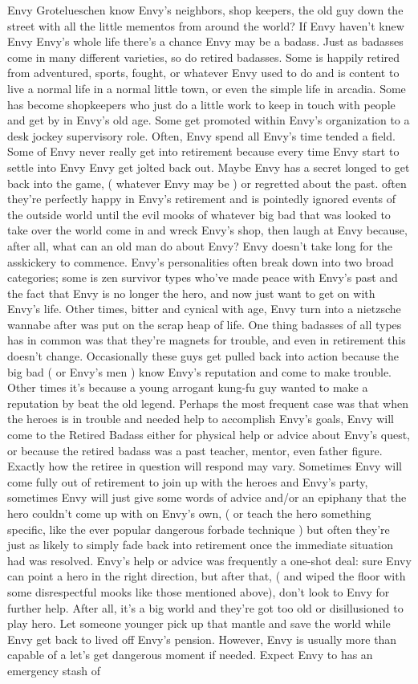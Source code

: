\documentclass[12pt]{book}
\begin{document}
Envy Grotelueschen know Envy's neighbors, shop keepers, the old guy down the street with all the little mementos from around the world? If Envy haven't knew Envy Envy's whole life there's a chance Envy may be a badass. Just as badasses come in many different varieties, so do retired badasses. Some is happily retired from adventured, sports, fought, or whatever Envy used to do and is content to live a normal life in a normal little town, or even the simple life in arcadia. Some has become shopkeepers who just do a little work to keep in touch with people and get by in Envy's old age. Some get promoted within Envy's organization to a desk jockey supervisory role. Often, Envy spend all Envy's time tended a field. Some of Envy never really get into retirement because every time Envy start to settle into Envy Envy get jolted back out. Maybe Envy has a secret longed to get back into the game, ( whatever Envy may be ) or regretted about the past. often they're perfectly happy in Envy's retirement and is pointedly ignored events of the outside world until the evil mooks of whatever big bad that was looked to take over the world come in and wreck Envy's shop, then laugh at Envy because, after all, what can an old man do about Envy? Envy doesn't take long for the asskickery to commence. Envy's personalities often break down into two broad categories; some is zen survivor types who've made peace with Envy's past and the fact that Envy is no longer the hero, and now just want to get on with Envy's life. Other times, bitter and cynical with age, Envy turn into a nietzsche wannabe after was put on the scrap heap of life. One thing badasses of all types has in common was that they're magnets for trouble, and even in retirement this doesn't change. Occasionally these guys get pulled back into action because the big bad ( or Envy's men ) know Envy's reputation and come to make trouble. Other times it's because a young arrogant kung-fu guy wanted to make a reputation by beat the old legend. Perhaps the most frequent case was that when the heroes is in trouble and needed help to accomplish Envy's goals, Envy will come to the Retired Badass either for physical help or advice about Envy's quest, or because the retired badass was a past teacher, mentor, even father figure. Exactly how the retiree in question will respond may vary. Sometimes Envy will come fully out of retirement to join up with the heroes and Envy's party, sometimes Envy will just give some words of advice and/or an epiphany that the hero couldn't come up with on Envy's own, ( or teach the hero something specific, like the ever popular dangerous forbade technique ) but often they're just as likely to simply fade back into retirement once the immediate situation had was resolved. Envy's help or advice was frequently a one-shot deal: sure Envy can point a hero in the right direction, but after that, ( and wiped the floor with some disrespectful mooks like those mentioned above), don't look to Envy for further help. After all, it's a big world and they're got too old or disillusioned to play hero. Let someone younger pick up that mantle and save the world while Envy get back to lived off Envy's pension. However, Envy is usually more than capable of a let's get dangerous moment if needed. Expect Envy to has an emergency stash of 
\end{document}
